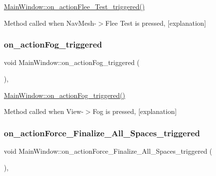 \hyperlink{class_main_window_aa7c4d3fb11b9a0b3e4913e83c2a141c4}{Main\+Window\+::on\+\_\+action\+Flee\+\_\+\+Test\+\_\+triggered()} 

Method called when Nav\+Mesh-\/$>$Flee Test is pressed, \mbox{[}explanation\mbox{]} \mbox{\label{class_main_window_af815e187182d6f7ccfb7264814a128f9}} 
\subsubsection{\texorpdfstring{on\+\_\+action\+Fog\+\_\+triggered}{on\_actionFog\_triggered}}
{\footnotesize\ttfamily void Main\+Window\+::on\+\_\+action\+Fog\+\_\+triggered (\begin{DoxyParamCaption}{ }\end{DoxyParamCaption})\hspace{0.3cm}{\ttfamily [private]}, {\ttfamily [slot]}}



\hyperlink{class_main_window_af815e187182d6f7ccfb7264814a128f9}{Main\+Window\+::on\+\_\+action\+Fog\+\_\+triggered()} 

Method called when View-\/$>$Fog is pressed, \mbox{[}explanation\mbox{]} \mbox{\label{class_main_window_a2ac15d9b187bae1395956be2636bf84b}} 
\subsubsection{\texorpdfstring{on\+\_\+action\+Force\+\_\+\+Finalize\+\_\+\+All\+\_\+\+Spaces\+\_\+triggered}{on\_actionForce\_Finalize\_All\_Spaces\_triggered}}
{\footnotesize\ttfamily void Main\+Window\+::on\+\_\+action\+Force\+\_\+\+Finalize\+\_\+\+All\+\_\+\+Spaces\+\_\+triggered (\begin{DoxyParamCaption}{ }\end{DoxyParamCaption})\hspace{0.3cm}{\ttfamily [private]}, {\ttfamily [slot]}}



